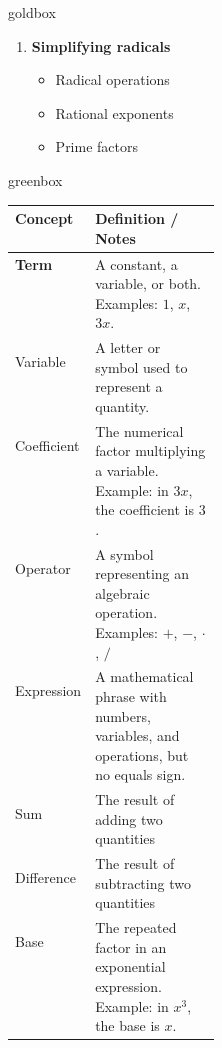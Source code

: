 \documentclass[10pt]{article}
\begin{document}
\begin{skillbox}{goldbox}
\begin{minipage}[t]{0.48\linewidth}
\begin{enumerate}[start=5]
                \item \textbf{Simplifying radicals}
                \begin{itemize}
                    \item Radical operations
                    \item Rational exponents
                    \item Prime factors
                \end{itemize}
            \end{enumerate}
        \end{minipage}
    \end{skillbox}

    \begin{skillbox}{greenbox}
        \renewcommand{\arraystretch}{1.35}
        \begin{tabularx}{\linewidth}{
                >{\bfseries}p{0.24\linewidth}
            X
        }
        \textbf{Concept} & \textbf{Definition / Notes} \\
        \hline
        \endhead
        {Term}
        & {A constant, a variable, or both. Examples: $1$, $x$, $3x$.} \\
        \hline

        {Variable}
        & {A letter or symbol used to represent a quantity.} \\
        \hline

        {Coefficient}
        & {The numerical factor multiplying a variable.
        Example: in $3x$, the coefficient is $3$.} \\
        \hline

        {Operator}
        & {A symbol representing an algebraic operation. Examples: $+$, $-$, $\cdot$, $/$} \\
        \hline

        {Expression}
        & {A mathematical phrase with numbers, variables, and operations, but no equals sign.} \\
        \hline

        {Sum}
        & {The result of adding two quantities} \\
        \hline

        {Difference}
        & {The result of subtracting two quantities} \\
        \hline

        {Base}
        & {The repeated factor in an exponential expression. Example: in $x^3$, the base is $x$.} \\
        \hline


\end{tabularx}
\end{skillbox}
\end{document}
